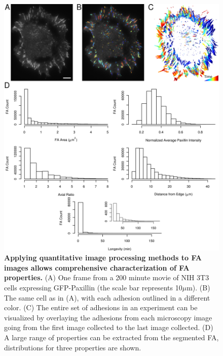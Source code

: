 \documentclass[letterpaper,draft]{article}
\begin{document}
\begin{figure}[htbp]
\begin{center}
\includegraphics[width=\textwidth]{../figures/statics/statics}
\caption{
{\bf Applying quantitative image processing methods to FA images allows comprehensive characterization of FA properties.} (A) One frame from a 200 minute movie of NIH 3T3 cells expressing GFP-Paxillin (the scale bar represents 10$\mu$m). (B) The same cell as in (A), with each adhesion outlined in a different color. (C) The entire set of adhesions in an experiment can be visualized by overlaying the adhesions from each microscopy image going from the first image collected to the last image collected. (D) A large range of properties can be extracted from the segmented FA, distributions for three properties are shown.
}
\label{statics}
\end{center}
\end{figure}
\end{document}
